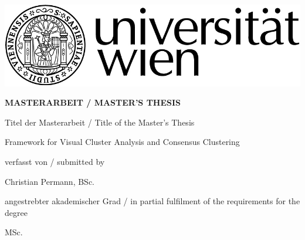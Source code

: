 \begin{titlepage}
\vspace*{-2cm}  %
\begin{flushright}
	\includegraphics[width=.5\textwidth]{titlepage/RZ_Logo_Uni_sw_01.jpg}
\end{flushright}
\vspace{1cm}

\begin{center}  %
    \huge{\textbf{\textsf{\MakeUppercase{
        MASTERARBEIT / MASTER'S THESIS
    }}}}
    \vspace{2cm}

    \large{\textsf{  %
        Titel der Masterarbeit / Title of the Master's Thesis
    }}
    \vspace{.1cm}

    \LARGE{\textsf{  %
        {\glqq}Framework for Visual Cluster Analysis and Consensus Clustering\grqq
    }}
    \vspace{2cm}

    \large{\textsf{  %
        verfasst von / submitted by
    }}

    \Large{\textsf{  %
        Christian Permann, BSc.
    }}
    \vspace{2cm}

    \large{\textsf{
        angestrebter akademischer Grad / in partial fulfilment of the requirements for the degree  %
    }}

    \Large{\textsf{  %
				MSc.
    }}
\end{center}
\vspace{2cm}


\end{titlepage}
